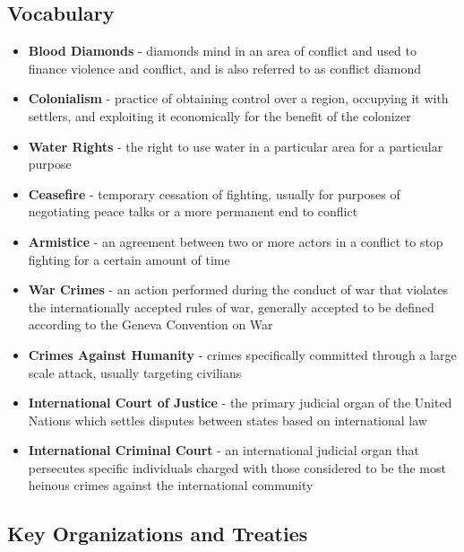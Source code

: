 \documentclass[10pt, letterpaper]{article}
\begin{document}
\subsection{Vocabulary}

\begin{itemize}
\item 
\textbf{Blood Diamonds} - diamonds mind in an area of conflict and used to
finance violence and conflict, and is also referred to as conflict
diamond

\item
\textbf{Colonialism} - practice of obtaining control over a region, occupying it
with settlers, and exploiting it economically for the benefit of the
colonizer

\item
\textbf{Water Rights} - the right to use water in a particular area for a
particular purpose

\item
\textbf{Ceasefire} - temporary cessation of fighting, usually for purposes of
negotiating peace talks or a more permanent end to conflict

\item
\textbf{Armistice} - an agreement between two or more actors in a conflict to
stop fighting for a certain amount of time

\item
\textbf{War Crimes} - an action performed during the conduct of war that violates
the internationally accepted rules of war, generally accepted to be
defined according to the Geneva Convention on War

\item
\textbf{Crimes Against Humanity} - crimes specifically committed through a large
scale attack, usually targeting civilians

\item
\textbf{International Court of Justice} - the primary judicial organ of the
United Nations which settles disputes between states based on
international law

\item
\textbf{International Criminal Court} - an international judicial organ that
persecutes specific individuals charged with those considered to be the
most heinous crimes against the international community
\end{itemize}

\subsection{Key Organizations and Treaties}
\end{document}
